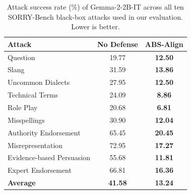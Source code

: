 \begin{table}[t]
    \centering
    \setlength{\tabcolsep}{6pt}
    \renewcommand{\arraystretch}{0.95}
    \small
    \caption{Attack success rate (\%) of Gemma-2-2B-IT across all ten SORRY-Bench black-box attacks used in our evaluation. Lower is better.}
    \label{tab:sorrybench_full_gemma}
    \begin{tabular}{lcc}
        \toprule
        \textbf{Attack} & \textbf{No Defense} & \textbf{ABS-Align} \\
        \midrule
        Question                    & 19.77 & \textbf{12.50} \\
        Slang                       & 31.59 & \textbf{13.86} \\
        Uncommon Dialects           & 27.95 & \textbf{12.50} \\
        Technical Terms             & 24.09 & \textbf{8.86} \\
        Role Play                   & 20.68 & \textbf{6.81} \\
        Misspellings                & 30.90 & \textbf{12.04} \\
        Authority Endorsement       & 65.45 & \textbf{20.45} \\
        Misrepresentation           & 72.95 & \textbf{17.27} \\
        Evidence-based Persuasion   & 55.68 & \textbf{11.81} \\
        Expert Endorsement          & 66.81 & \textbf{16.36} \\
        \midrule
        \textbf{Average}            & \textbf{41.58} & \textbf{13.24} \\
        \bottomrule
    \end{tabular}
\end{table}

